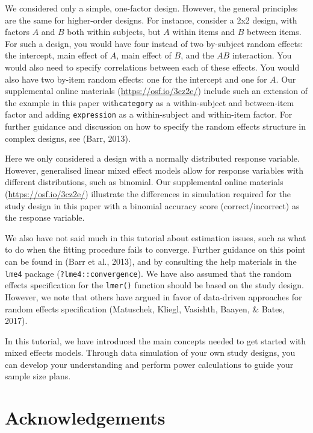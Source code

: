 \documentclass[
  english,
  doc,floatsintext]{apa6}
\begin{document}
We considered only a simple, one-factor design. However, the general principles are the same for higher-order designs. For instance, consider a 2x2 design, with factors \(A\) and \(B\) both within subjects, but \(A\) within items and \(B\) between items. For such a design, you would have four instead of two by-subject random effects: the intercept, main effect of \(A\), main effect of \(B\), and the \(AB\) interaction. You would also need to specify correlations between each of these effects. You would also have two by-item random effects: one for the intercept and one for \(A\). Our supplemental online materials (\url{https://osf.io/3cz2e/}) include such an extension of the example in this paper with\texttt{category} as a within-subject and between-item factor and adding \texttt{expression} as a within-subject and within-item factor. For further guidance and discussion on how to specify the random effects structure in complex designs, see (Barr, 2013).

Here we only considered a design with a normally distributed response variable. However, generalised linear mixed effect models allow for response variables with different distributions, such as binomial. Our supplemental online materials (\url{https://osf.io/3cz2e/}) illustrate the differences in simulation required for the study design in this paper with a binomial accuracy score (correct/incorrect) as the response variable.

We also have not said much in this tutorial about estimation issues, such as what to do when the fitting procedure fails to converge. Further guidance on this point can be found in (Barr et al., 2013), and by consulting the help materials in the \texttt{lme4} package (\texttt{?lme4::convergence}). We have also assumed that the random effects specification for the \texttt{lmer()} function should be based on the study design. However, we note that others have argued in favor of data-driven approaches for random effects specification (Matuschek, Kliegl, Vasishth, Baayen, \& Bates, 2017).

In this tutorial, we have introduced the main concepts needed to get started with mixed effects models. Through data simulation of your own study designs, you can develop your understanding and perform power calculations to guide your sample size plans.

\hypertarget{acknowledgements}{%
\section{Acknowledgements}\label{acknowledgements}}
\end{document}
